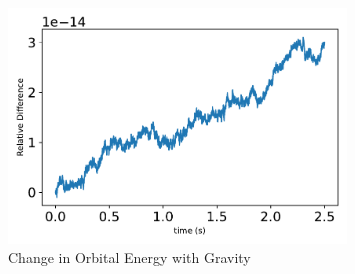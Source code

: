 \begin{figure}[htbp]\centerline{\includegraphics[width=0.8\textwidth]{AutoTeX/ChangeInOrbitalEnergyGravity}}\caption{Change in Orbital Energy with Gravity}\label{fig:ChangeInOrbitalEnergyGravity}\end{figure}
